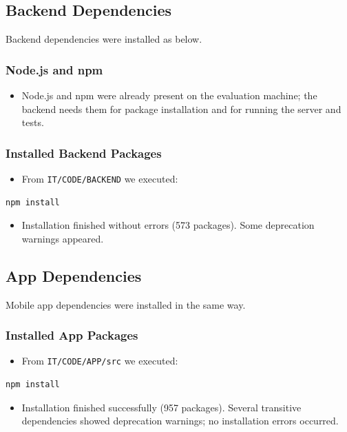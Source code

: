 \subsection{Backend Dependencies}
\label{subsec:backend_deps}
Backend dependencies were installed as below.

\subsubsection{Node.js and npm}
\begin{itemize}
    \item Node.js and npm were already present on the evaluation machine; the backend needs them for package installation and for running the server and tests.
\end{itemize}

\subsubsection{Installed Backend Packages}
\begin{itemize}
    \item From \texttt{IT/CODE/BACKEND} we executed:
\end{itemize}
\begin{verbatim}
npm install
\end{verbatim}
\begin{itemize}
    \item Installation finished without errors (573 packages). Some deprecation warnings appeared.
\end{itemize}

\subsection{App Dependencies}
\label{subsec:app_deps}
Mobile app dependencies were installed in the same way.

\subsubsection{Installed App Packages}
\begin{itemize}
    \item From \texttt{IT/CODE/APP/src} we executed:
\end{itemize}
\begin{verbatim}
npm install
\end{verbatim}
\begin{itemize}
    \item Installation finished successfully (957 packages). Several transitive dependencies showed deprecation warnings; no installation errors occurred.
\end{itemize}

